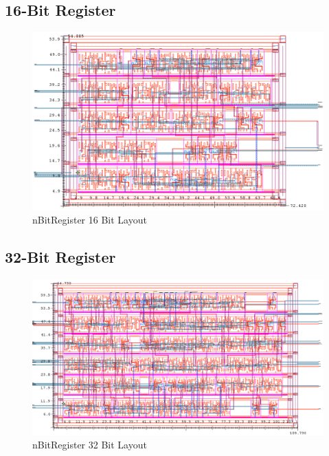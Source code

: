 \documentclass[11pt]{article}
\begin{document}
	\subsection{16-Bit Register}
		\begin{figure}[H] 
			\centering 
			\includegraphics[width=\textwidth,height=\dimexpr\textheight-4\baselineskip-\abovecaptionskip-\belowcaptionskip\relax,keepaspectratio]{"Pictures/nBitRegister 16-Bit Layout"}
			\caption{nBitRegister 16 Bit Layout} 
			\label{fig:nBitRegister-16-Bit-Layout} 
		\end{figure}
	
	
	\subsection{32-Bit Register}
	
		\begin{figure}[H] 
			\centering 
			\includegraphics[width=\textwidth,height=\dimexpr\textheight-4\baselineskip-\abovecaptionskip-\belowcaptionskip\relax,keepaspectratio]{"Pictures/nBitRegister 32-Bit Layout"}
			\caption{nBitRegister 32 Bit Layout} 
			\label{fig:nBitRegister-32-Bit-Layout} 
		\end{figure}
	
\end{document}
